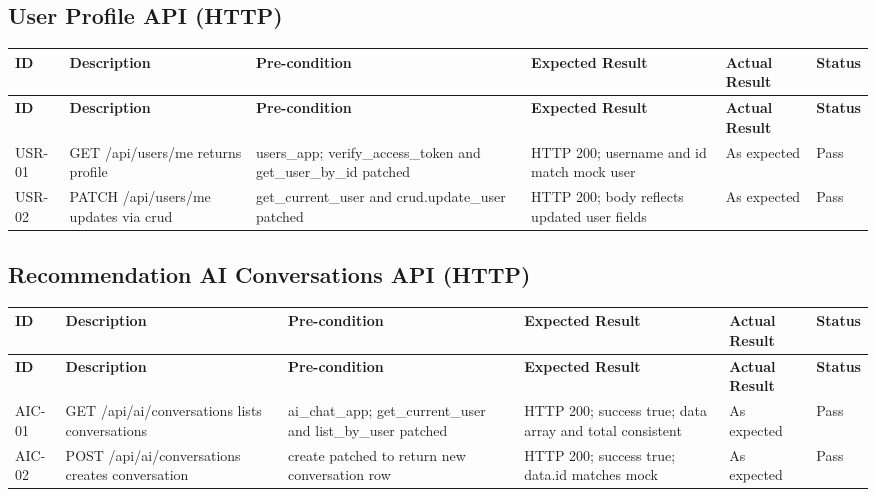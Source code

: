 \begin{appendices}
{\begin{longtable}{|p{1.2cm}|p{3.0cm}|p{3.0cm}|p{3.2cm}|p{2.2cm}|p{1.1cm}|}
\end{longtable}

\subsection*{User Profile API (HTTP)}
\begin{longtable}{|p{1.2cm}|p{3.0cm}|p{3.0cm}|p{3.2cm}|p{2.2cm}|p{1.1cm}|}
\hline
\textbf{ID} & \textbf{Description} & \textbf{Pre-condition} & \textbf{Expected Result} & \textbf{Actual Result} & \textbf{Status} \\
\hline
\endfirsthead
\hline
\textbf{ID} & \textbf{Description} & \textbf{Pre-condition} & \textbf{Expected Result} & \textbf{Actual Result} & \textbf{Status} \\
\hline
\endhead
\hline
\endfoot

USR-01 &
GET /api/users/me returns profile &
users\_app; verify\_access\_token and get\_user\_by\_id patched &
HTTP 200; username and id match mock user &
As expected &
Pass \\
\hline

USR-02 &
PATCH /api/users/me updates via crud &
get\_current\_user and crud.update\_user patched &
HTTP 200; body reflects updated user fields &
As expected &
Pass \\
\hline

\end{longtable}

\subsection*{Recommendation AI Conversations API (HTTP)}
\begin{longtable}{|p{1.2cm}|p{3.0cm}|p{3.0cm}|p{3.2cm}|p{2.2cm}|p{1.1cm}|}
\hline
\textbf{ID} & \textbf{Description} & \textbf{Pre-condition} & \textbf{Expected Result} & \textbf{Actual Result} & \textbf{Status} \\
\hline
\endfirsthead
\hline
\textbf{ID} & \textbf{Description} & \textbf{Pre-condition} & \textbf{Expected Result} & \textbf{Actual Result} & \textbf{Status} \\
\hline
\endhead
\hline
\endfoot

AIC-01 &
GET /api/ai/conversations lists conversations &
ai\_chat\_app; get\_current\_user and list\_by\_user patched &
HTTP 200; success true; data array and total consistent &
As expected &
Pass \\
\hline

AIC-02 &
POST /api/ai/conversations creates conversation &
create patched to return new conversation row &
HTTP 200; success true; data.id matches mock &
As expected &
Pass \\
\hline


\end{longtable}}
\end{appendices}
